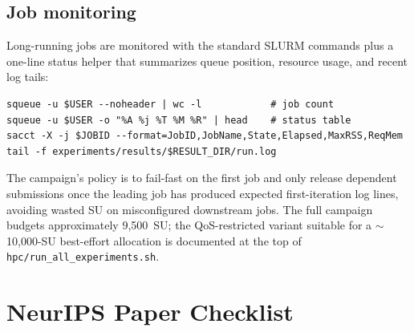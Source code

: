 \documentclass{article}
\theoremstyle{definition}
\begin{document}
\subsection{Job monitoring}

Long-running jobs are monitored with the standard SLURM commands plus a one-line status helper that summarizes queue position, resource usage, and recent log tails:

\begin{verbatim}
squeue -u $USER --noheader | wc -l            # job count
squeue -u $USER -o "%A %j %T %M %R" | head    # status table
sacct -X -j $JOBID --format=JobID,JobName,State,Elapsed,MaxRSS,ReqMem
tail -f experiments/results/$RESULT_DIR/run.log
\end{verbatim}

The campaign's policy is to fail-fast on the first job and only release dependent submissions once the leading job has produced expected first-iteration log lines, avoiding wasted SU on misconfigured downstream jobs. The full campaign budgets approximately 9{,}500~SU; the QoS-restricted variant suitable for a $\sim$10{,}000-SU best-effort allocation is documented at the top of \texttt{hpc/run\_all\_experiments.sh}.



\newpage
\section*{NeurIPS Paper Checklist}
\end{document}

